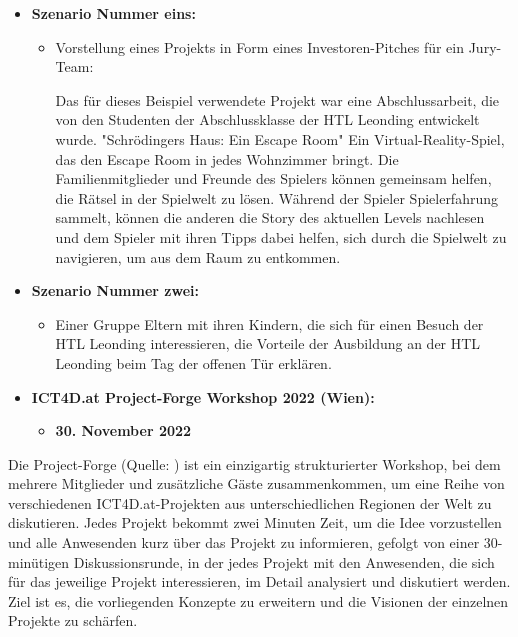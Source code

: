 \begin{itemize}
    \item \textbf{Szenario Nummer eins: }
          \begin{itemize}
              \item {Vorstellung eines Projekts in Form eines Investoren-Pitches für ein Jury-Team:

                    Das für dieses Beispiel verwendete Projekt war eine Abschlussarbeit, die von den Studenten der Abschlussklasse der HTL Leonding entwickelt wurde. "Schrödingers Haus: Ein Escape Room" Ein Virtual-Reality-Spiel, das den Escape Room in jedes Wohnzimmer bringt. Die Familienmitglieder und Freunde des Spielers können gemeinsam helfen, die Rätsel in der Spielwelt zu lösen. Während der Spieler Spielerfahrung sammelt, können die anderen die Story des aktuellen Levels nachlesen und dem Spieler mit ihren Tipps dabei helfen, sich durch die Spielwelt zu navigieren, um aus dem Raum zu entkommen.}
          \end{itemize}
    \item \textbf{Szenario Nummer zwei: }
          \begin{itemize}
              \item {Einer Gruppe Eltern mit ihren Kindern, die sich für einen Besuch der HTL Leonding interessieren, die Vorteile der Ausbildung an der HTL Leonding beim Tag der offenen Tür erklären.}
          \end{itemize}
\end{itemize}

\begin{itemize}
    \item \textbf{ICT4D.at Project-Forge Workshop 2022 (Wien):}
          \begin{itemize}
              \item \textbf{30. November 2022}
          \end{itemize}
\end{itemize}


Die Project-Forge (Quelle: ) ist ein einzigartig strukturierter Workshop, bei dem mehrere Mitglieder und zusätzliche Gäste zusammenkommen, um eine Reihe von verschiedenen ICT4D.at-Projekten aus unterschiedlichen Regionen der Welt zu diskutieren. Jedes Projekt bekommt zwei Minuten Zeit, um die Idee vorzustellen und alle Anwesenden kurz über das Projekt zu informieren, gefolgt von einer 30-minütigen Diskussionsrunde, in der jedes Projekt mit den Anwesenden, die sich für das jeweilige Projekt interessieren, im Detail analysiert und diskutiert werden. Ziel ist es, die vorliegenden Konzepte zu erweitern und die Visionen der einzelnen Projekte zu schärfen.

